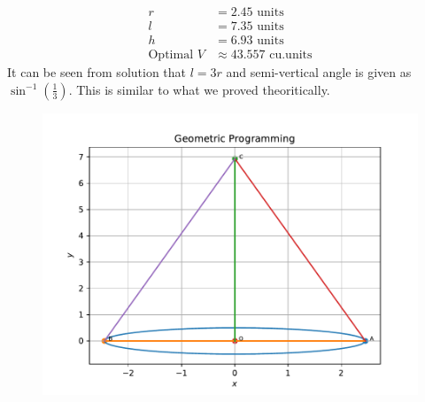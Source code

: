 \documentclass[12pt]{article}
\providecommand{\brak}[1]{\ensuremath{\left(#1\right)}}
\begin{document}
\begin{enumerate}
\begin{enumerate}
\begin{align}
	r &= 2.45 \text{ units} \\
	l &= 7.35 \text{ units} \\
	h &= 6.93 \text{ units} \\
	\text{Optimal } V &\approx 43.557 \text{ cu.units}
\end{align}
It can be seen from solution that $l = 3r$ and semi-vertical angle is given as $\sin^{-1}\brak{\frac{1}{3}}$. This is similar to what we proved theoritically.
\end{enumerate}
\begin{figure}[!h]
	\begin{center}
		\includegraphics[width=\columnwidth]{figs/problem26.pdf}
	\end{center}
\caption{}
\label{fig:Fig1}
\end{figure}
\end{enumerate}
\end{document}
